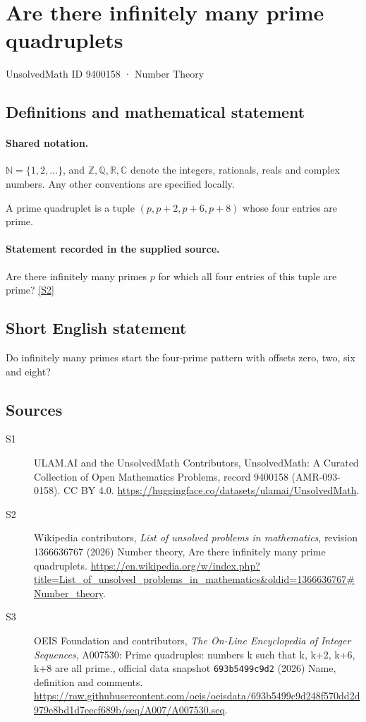 \documentclass[11pt]{article}
\newcommand{\sref}[2]{\hyperlink{source:#1:#2}{[S#2]}}
\begin{document}
\setcounter{section}{9400157}
\section{Are there infinitely many prime quadruplets}\label{9400158}
{\small\sffamily UnsolvedMath ID 9400158 · Number Theory}
\subsection{Definitions and mathematical statement}

\paragraph{Shared notation.}$\mathbb N=\{1,2,\ldots\}$, and $\mathbb Z,\mathbb Q,\mathbb R,\mathbb C$ denote the integers, rationals, reals and complex numbers. Any other conventions are specified locally.


A prime quadruplet is a tuple $(p,p+2,p+6,p+8)$ whose four entries are prime.
\paragraph{Statement recorded in the supplied source.}
Are there infinitely many primes $p$ for which all four entries of this tuple are prime? \sref{9400158}{2}
\subsection{Short English statement}
Do infinitely many primes start the four-prime pattern with offsets zero, two, six and eight?
\subsection{Sources}
\begin{description}
\item[\hypertarget{source:9400158:1}{S1}] ULAM.AI and the UnsolvedMath Contributors, UnsolvedMath: A Curated Collection of Open Mathematics Problems, record 9400158 (AMR-093-0158). CC BY 4.0. \url{https://huggingface.co/datasets/ulamai/UnsolvedMath}.
\item[\hypertarget{source:9400158:2}{S2}] Wikipedia contributors, \emph{List of unsolved problems in mathematics}, revision 1366636767 (2026) Number theory, Are there infinitely many prime quadruplets. \url{https://en.wikipedia.org/w/index.php?title=List_of_unsolved_problems_in_mathematics&oldid=1366636767#Number_theory}.
\item[\hypertarget{source:9400158:3}{S3}] OEIS Foundation and contributors, \emph{The On-Line Encyclopedia of Integer Sequences}, A007530: Prime quadruples: numbers k such that k, k+2, k+6, k+8 are all prime., official data snapshot \texttt{693b5499c9d2} (2026) Name, definition and comments. \url{https://raw.githubusercontent.com/oeis/oeisdata/693b5499c9d248f570dd2d979e8bd1d7eecf689b/seq/A007/A007530.seq}.
\end{description}
\label{end:9400158}
\end{document}
